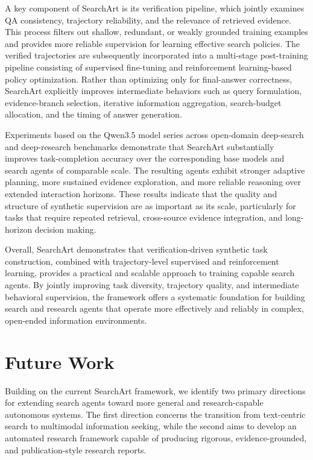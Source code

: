 \documentclass{huawei}
\begin{document}
A key component of SearchArt is its verification pipeline, which jointly examines QA consistency, trajectory reliability, and the relevance of retrieved evidence. This process filters out shallow, redundant, or weakly grounded training examples and provides more reliable supervision for learning effective search policies. The verified trajectories are subsequently incorporated into a multi-stage post-training pipeline consisting of supervised fine-tuning and reinforcement learning-based policy optimization. Rather than optimizing only for final-answer correctness, SearchArt explicitly improves intermediate behaviors such as query formulation, evidence-branch selection, iterative information aggregation, search-budget allocation, and the timing of answer generation.


Experiments based on the Qwen3.5 model series across open-domain deep-search and deep-research benchmarks demonstrate that SearchArt substantially improves task-completion accuracy over the corresponding base models and search agents of comparable scale. The resulting agents exhibit stronger adaptive planning, more sustained evidence exploration, and more reliable reasoning over extended interaction horizons. These results indicate that the quality and structure of synthetic supervision are as important as its scale, particularly for tasks that require repeated retrieval, cross-source evidence integration, and long-horizon decision making.


Overall, SearchArt demonstrates that verification-driven synthetic task construction, combined with trajectory-level supervised and reinforcement learning, provides a practical and scalable approach to training capable search agents. By jointly improving task diversity, trajectory quality, and intermediate behavioral supervision, the framework offers a systematic foundation for building search and research agents that operate more effectively and reliably in complex, open-ended information environments.


\section{Future Work}

Building on the current SearchArt framework, we identify two primary directions for extending search agents toward more general and research-capable autonomous systems. The first direction concerns the transition from text-centric search to multimodal information seeking, while the second aims to develop an automated research framework capable of producing rigorous, evidence-grounded, and publication-style research reports.
\end{document}
